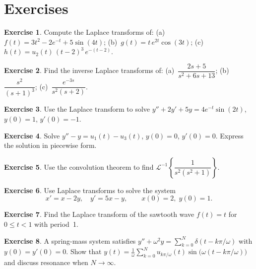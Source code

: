 \documentclass[12pt,a4paper,openany]{book}
\theoremstyle{definition}
\newtheorem{exercise}{Exercise}[chapter]
\theoremstyle{plain}
\theoremstyle{remark}
\begin{document}
\section{Exercises}
\label{sec:laplace-exercises}

\begin{exercise}
\label{exo:laplace-compute}
Compute the Laplace transforms of: (a)~\(f(t)=3t^2-2e^{-t}+5\sin(4t)\);
(b)~\(g(t)=t\,e^{2t}\cos(3t)\); (c)~\(h(t)=u_2(t)\,(t-2)^3\,e^{-(t-2)}\).
\end{exercise}

\begin{exercise}
\label{exo:laplace-inverse}
Find the inverse Laplace transforms of:
(a)~\(\dfrac{2s+5}{s^2+6s+13}\); \quad
(b)~\(\dfrac{s^2}{(s+1)^3}\); \quad
(c)~\(\dfrac{e^{-3s}}{s^2(s+2)}\).
\end{exercise}

\begin{exercise}
\label{exo:laplace-ivp1}
Use the Laplace transform to solve
\(y''+2y'+5y=4e^{-t}\sin(2t)\), \(y(0)=1\), \(y'(0)=-1\).
\end{exercise}

\begin{exercise}
\label{exo:laplace-ivp2}
Solve \(y''-y=u_1(t)-u_3(t)\), \(y(0)=0\), \(y'(0)=0\).
Express the solution in piecewise form.
\end{exercise}

\begin{exercise}
\label{exo:laplace-convolution}
Use the convolution theorem to find
\(\mathcal{L}^{-1}\!\left\{\dfrac{1}{s^2(s^2+1)}\right\}\).
\end{exercise}

\begin{exercise}
\label{exo:laplace-system}
Use Laplace transforms to solve the system
\[
  x' = x - 2y, \quad y' = 5x - y, \qquad x(0)=2,\;y(0)=1.
\]
\end{exercise}

\begin{exercise}
\label{exo:laplace-periodic}
Find the Laplace transform of the sawtooth wave
\(f(t)=t\) for \(0\le t<1\) with period~1.
\end{exercise}

\begin{exercise}
\label{exo:laplace-impulse}
A spring-mass system satisfies \(y''+\omega^2 y = \sum_{k=0}^{N}\delta(t-k\pi/\omega)\)
with \(y(0)=y'(0)=0\). Show that
\(y(t)=\frac{1}{\omega}\sum_{k=0}^{N} u_{k\pi/\omega}(t)\sin\bigl(\omega(t-k\pi/\omega)\bigr)\)
and discuss resonance when \(N\to\infty\).
\end{exercise}
\end{document}
